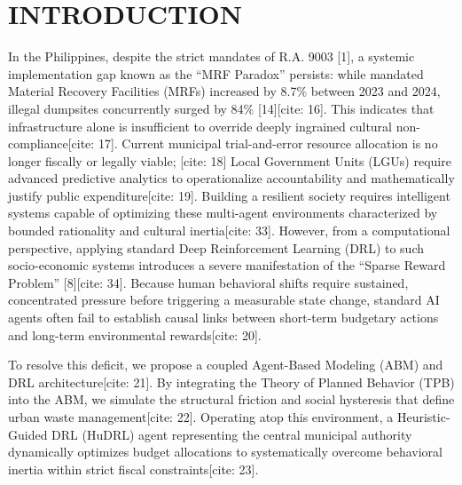\documentclass[conference]{IEEEtran}
\begin{document}
\section{INTRODUCTION}
In the Philippines, despite the strict mandates of R.A. 9003 [1], a systemic implementation gap known as the ``MRF Paradox'' persists: while mandated Material Recovery Facilities (MRFs) increased by 8.7\% between 2023 and 2024, illegal dumpsites concurrently surged by 84\% [14][cite: 16]. This indicates that infrastructure alone is insufficient to override deeply ingrained cultural non-compliance[cite: 17]. Current municipal trial-and-error resource allocation is no longer fiscally or legally viable; [cite: 18] Local Government Units (LGUs) require advanced predictive analytics to operationalize accountability and mathematically justify public expenditure[cite: 19]. Building a resilient society requires intelligent systems capable of optimizing these multi-agent environments characterized by bounded rationality and cultural inertia[cite: 33]. However, from a computational perspective, applying standard Deep Reinforcement Learning (DRL) to such socio-economic systems introduces a severe manifestation of the ``Sparse Reward Problem'' [8][cite: 34]. Because human behavioral shifts require sustained, concentrated pressure before triggering a measurable state change, standard AI agents often fail to establish causal links between short-term budgetary actions and long-term environmental rewards[cite: 20].

To resolve this deficit, we propose a coupled Agent-Based Modeling (ABM) and DRL architecture[cite: 21]. By integrating the Theory of Planned Behavior (TPB) into the ABM, we simulate the structural friction and social hysteresis that define urban waste management[cite: 22]. Operating atop this environment, a Heuristic-Guided DRL (HuDRL) agent representing the central municipal authority dynamically optimizes budget allocations to systematically overcome behavioral inertia within strict fiscal constraints[cite: 23].
\end{document}
